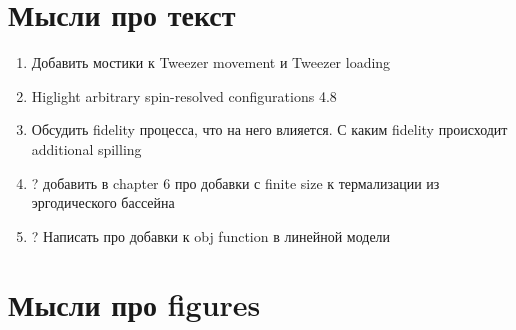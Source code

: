 

\section*{Мысли про текст}

\begin{enumerate}
	\item Добавить мостики к Tweezer movement и Tweezer loading
	\item Higlight arbitrary spin-resolved configurations 4.8
	\item Обсудить fidelity процесса, что на него влияется. С каким fidelity происходит additional spilling
	\item ? добавить в chapter 6 про добавки с finite size к термализации из эргодического бассейна
	\item ? Написать про добавки к obj function в линейной модели
	
	



\end{enumerate}



\section*{Мысли про figures}


